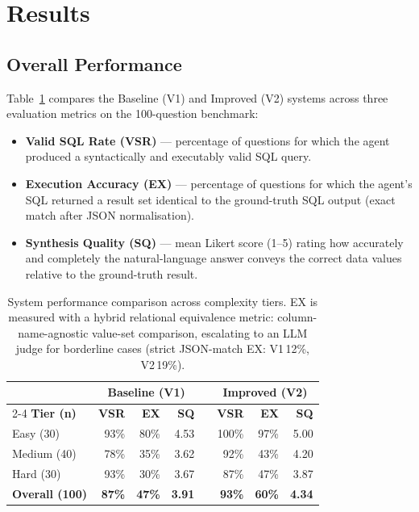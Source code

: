 
\section{Results}

\subsection{Overall Performance}

Table~\ref{tab:main_results} compares the Baseline (V1) and Improved (V2) systems
across three evaluation metrics on the 100-question benchmark:

\begin{itemize}
  \item \textbf{Valid SQL Rate (VSR)} — percentage of questions for which the agent
        produced a syntactically and executably valid SQL query.
  \item \textbf{Execution Accuracy (EX)} — percentage of questions for which the
        agent's SQL returned a result set identical to the ground-truth SQL output
        (exact match after JSON normalisation).
  \item \textbf{Synthesis Quality (SQ)} — mean Likert score (1–5) rating how
        accurately and completely the natural-language answer conveys the correct
        data values relative to the ground-truth result.
\end{itemize}

\begin{table}[h]
\centering
\caption{System performance comparison across complexity tiers. EX is measured
  with a hybrid relational equivalence metric: column-name-agnostic value-set
  comparison, escalating to an LLM judge for borderline cases (strict
  JSON-match EX: V1\,12\%, V2\,19\%).}
\label{tab:main_results}
\begin{tabular}{lrrrrrrr}
\toprule
 & \multicolumn{3}{c}{\textbf{Baseline (V1)}} & & \multicolumn{3}{c}{\textbf{Improved (V2)}} \\
\cmidrule{2-4} \cmidrule{6-8}
\textbf{Tier (n)} & \textbf{VSR} & \textbf{EX} & \textbf{SQ} & &
                    \textbf{VSR} & \textbf{EX} & \textbf{SQ} \\
\midrule
Easy   (30) & 93\% & 80\% & 4.53 & & 100\% & 97\% & 5.00 \\
Medium (40) & 78\% & 35\% & 3.62 & &  92\% & 43\% & 4.20 \\
Hard   (30) & 93\% & 30\% & 3.67 & &  87\% & 47\% & 3.87 \\
\midrule
\textbf{Overall (100)} & \textbf{87\%} & \textbf{47\%} & \textbf{3.91} & &
                        \textbf{93\%} & \textbf{60\%} & \textbf{4.34} \\
\bottomrule
\end{tabular}
\end{table}

